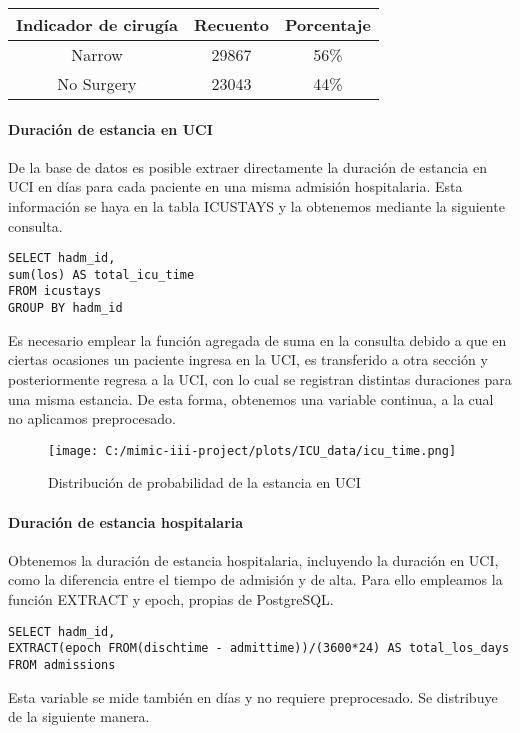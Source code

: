 \documentclass{report}
\begin{document}
\begin{longtable}[]{@{}ccc@{}}
\toprule
Indicador de cirugía & Recuento & Porcentaje\tabularnewline
\midrule
\endhead
Narrow & 29867 & 56\%\tabularnewline
No Surgery & 23043 & 44\%\tabularnewline
\bottomrule
\end{longtable}

\paragraph{Duración de estancia en UCI}
De la base de datos es posible extraer directamente la duración de
estancia en UCI en días para cada paciente en una misma admisión
hospitalaria. Esta información se haya en la tabla ICUSTAYS y la
obtenemos mediante la siguiente consulta.

\begin{verbatim}
SELECT hadm_id, 
sum(los) AS total_icu_time 
FROM icustays
GROUP BY hadm_id
\end{verbatim}

Es necesario emplear la función agregada de suma en la consulta debido a
que en ciertas ocasiones un paciente ingresa en la UCI, es transferido a
otra sección y posteriormente regresa a la UCI, con lo cual se registran
distintas duraciones para una misma estancia. De esta forma, obtenemos
una variable continua, a la cual no aplicamos preprocesado.


\begin{figure}[H]
\centering
\texttt{[image: C:/mimic-iii-project/plots/ICU\_data/icu\_time.png]}
\caption{Distribución de probabilidad de la estancia en UCI}
\end{figure}


\paragraph{Duración de estancia hospitalaria}

Obtenemos la duración de estancia hospitalaria, incluyendo la duración
en UCI, como la diferencia entre el tiempo de admisión y de alta. Para
ello empleamos la función EXTRACT y epoch, propias de PostgreSQL.

\begin{verbatim}
SELECT hadm_id, 
EXTRACT(epoch FROM(dischtime - admittime))/(3600*24) AS total_los_days
FROM admissions
\end{verbatim}
Esta variable se mide también en días y no requiere preprocesado. Se distribuye de la siguiente manera.
\end{document}

